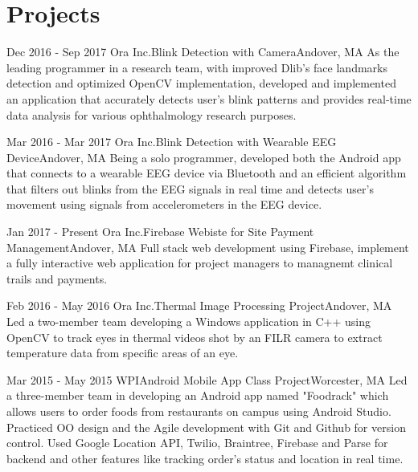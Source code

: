 \documentclass[10pt,a4paper,merriweather]{moderncv}        %
\begin{document}
\section{Projects}

\cventry
{Dec 2016 - Sep 2017}
{Ora Inc.}{Blink Detection with Camera}{Andover, MA}{}
{As the leading programmer in a research team, with improved Dlib's face landmarks detection and optimized OpenCV implementation, developed and implemented an application that accurately detects user's blink patterns and provides real-time data analysis for various ophthalmology research purposes.}
\vspace{.15cm}

\cventry
{Mar 2016 - Mar 2017}
{Ora Inc.}{Blink Detection with Wearable EEG Device}{Andover, MA}{}
{Being a solo programmer, developed both the Android app that connects to a wearable EEG device via Bluetooth and an efficient algorithm that filters out blinks from the EEG signals in real time and detects user's movement using signals from accelerometers in the EEG device.}
\vspace{.15cm}

\cventry
{Jan 2017 - Present}
{Ora Inc.}{Firebase Webiste for Site Payment Management}{Andover, MA}{}
{Full stack web development using Firebase, implement a fully interactive web application for project managers to managnemt clinical trails and payments.   }
\vspace{.15cm}

\cventry
{Feb 2016 - May 2016}
{Ora Inc.}{Thermal Image Processing Project}{Andover, MA}{}
{Led a two-member team developing a Windows application in C++ using OpenCV to track eyes in thermal videos shot by an FILR camera to extract temperature data from specific areas of an eye. }
\vspace{.15cm}

\cventry
{Mar 2015 - May 2015}
{WPI}{Android Mobile App Class Project}{Worcester, MA}{}
{Led a three-member team in developing an Android app named "Foodrack" which allows users to order foods from restaurants on campus using Android Studio. Practiced OO design and the Agile development with Git and Github for version control. Used Google Location API, Twilio, Braintree, Firebase and Parse for backend and other features like tracking order's status and location in real time. }
\vspace{.15cm}
\end{document}
